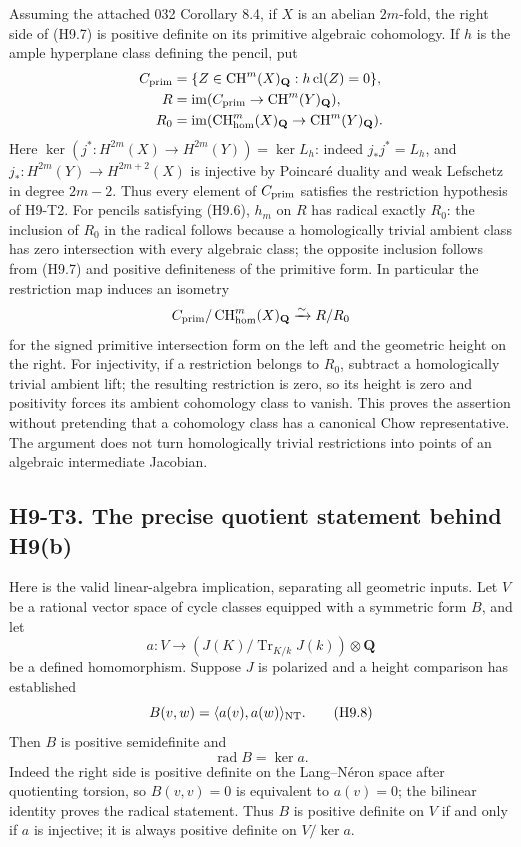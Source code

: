 \documentclass[11pt,a4paper]{article}
\begin{document}
Assuming the attached 032 Corollary 8.4, if $X$ is an abelian $2m$-fold,
the right side of (H9.7) is positive definite on its primitive algebraic
cohomology. If $h$ is the ample hyperplane class defining the pencil, put
\[
\begin{split}
 C_{\rm prim}&=\{Z\in\operatorname{CH}^m(X)_{\mathbf Q}:
                          h\operatorname{cl}(Z)=0\},\\
 R&=\operatorname{im}(C_{\rm prim}\to\operatorname{CH}^m(Y)_{\mathbf Q}),\\
 R_0&=\operatorname{im}(\operatorname{CH}^m_{\rm hom}(X)_{\mathbf Q}
                         \to\operatorname{CH}^m(Y)_{\mathbf Q}).
\end{split}
\]
Here $\ker(j^*:H^{2m}(X)\to H^{2m}(Y))=\ker L_h$: indeed
$j_*j^*=L_h$, and $j_*:H^{2m}(Y)\to H^{2m+2}(X)$ is injective by
Poincar\'e duality and weak Lefschetz in degree $2m-2$. Thus every element
of $C_{\rm prim}$ satisfies the restriction hypothesis of H9-T2.
For pencils satisfying (H9.6), $h_m$ on $R$ has radical exactly $R_0$:
the inclusion of $R_0$ in the radical follows because a homologically
trivial ambient class has zero intersection with every algebraic class;
the opposite inclusion follows from (H9.7) and positive definiteness of
the primitive form. In particular the restriction map induces an
isometry
\[
 C_{\rm prim}/\operatorname{CH}^m_{\rm hom}(X)_{\mathbf Q}
       \xrightarrow{\sim}R/R_0
\]
for the signed primitive intersection form on the left and the geometric
height on the right. For injectivity, if a restriction belongs to $R_0$,
subtract a homologically trivial ambient lift; the resulting restriction
is zero, so its height is zero and positivity forces its ambient
cohomology class to vanish. This proves the assertion without pretending
that a cohomology class has a canonical Chow representative. The argument
does not turn homologically trivial restrictions into points of an
algebraic intermediate Jacobian.

\subsection*{H9-T3. The precise quotient statement behind H9(b)}

Here is the valid linear-algebra implication, separating all geometric
inputs. Let $V$ be a rational vector space of cycle classes equipped with
a symmetric form $B$, and let
\[
 a:V\longrightarrow
 (J(K)/\operatorname{Tr}_{K/k}J(k))\otimes\mathbf Q
\]
be a defined homomorphism. Suppose $J$ is polarized and a height comparison
has established
\[
 B(v,w)=\langle a(v),a(w)\rangle_{\rm NT}.
                                                        \tag{H9.8}
\]
Then $B$ is positive semidefinite and
\[
 \operatorname{rad}B=\ker a.
\]
Indeed the right side is positive definite on the Lang--N\'eron space
after quotienting torsion, so $B(v,v)=0$ is equivalent to $a(v)=0$; the
bilinear identity proves the radical statement. Thus $B$ is positive
definite on $V$ if and only if $a$ is injective; it is always positive
definite on $V/\ker a$.
\end{document}
